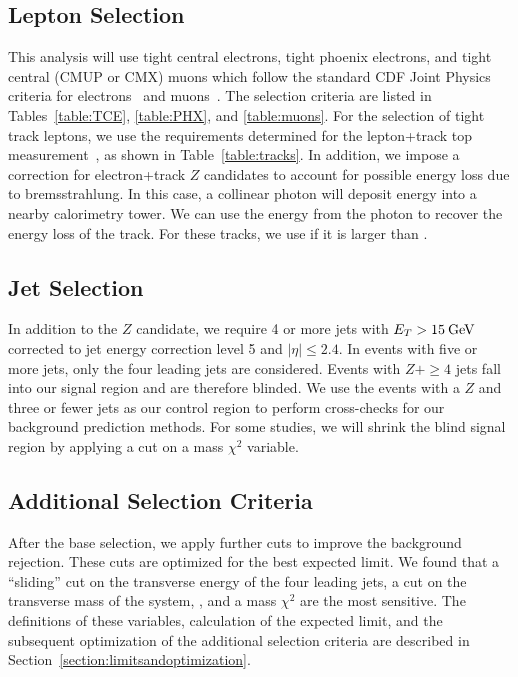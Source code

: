 \subsection{Lepton Selection}
This analysis will use tight central electrons, tight
phoenix electrons, and tight central (CMUP or CMX) muons which follow the 
standard CDF Joint Physics criteria for electrons~\cite{JPElectron} and 
muons~\cite{JPMuon}. The selection criteria are listed in 
Tables~\ref{table:TCE}, \ref{table:PHX}, and \ref{table:muons}.
For the selection of tight track leptons, we use the requirements determined for
the lepton+track top \xsect measurement~\cite{CDF8696}, as shown in
Table~\ref{table:tracks}. In addition, we impose a correction for 
electron+track $Z$ candidates to account for possible energy loss due to 
bremsstrahlung. In this case, a collinear photon will deposit energy into a 
nearby calorimetry tower. We can use the energy from the photon to recover 
the energy loss of the track. For these tracks, we use \et if it is larger than \pt.


\subsection{Jet Selection}
In addition to the $Z$ candidate, we require 4 or more jets with
$E_{T}> 15\:\mathrm{GeV}$ corrected to jet energy correction level 5 and $|\eta|
\leq 2.4$. In events with five or more jets, only the four leading
jets are considered. Events with $Z+\geq 4$ jets fall into our signal region and
are therefore blinded. We use the events with a $Z$ and three or fewer
jets as our control region to perform cross-checks for our background
prediction methods. For some studies, we will shrink the blind signal
region by applying a cut on a mass $\chi^2$ variable.
 
\subsection{Additional Selection Criteria}
After the base selection, we apply further cuts to improve the
background rejection. These cuts are optimized for the best expected
limit. We found that a ``sliding'' cut on the transverse energy of the
four leading jets, a cut on the transverse mass of the system, \mt, and a
mass $\chi^2$ are the most sensitive. The definitions of these variables, 
calculation of the expected limit, and the subsequent optimization of 
the additional selection criteria are described in 
Section~\ref{section:limitsandoptimization}.

